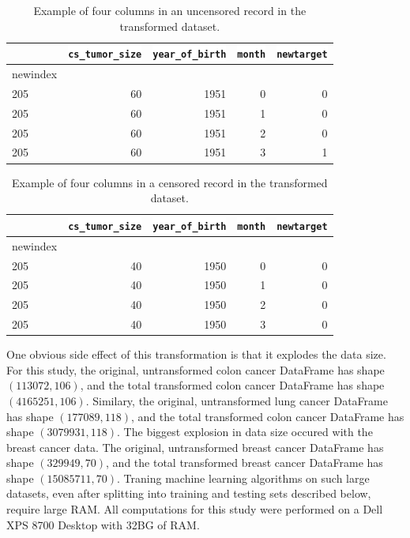 \documentclass[a4paper,11pt]{article}
\newcommand{\codewhite}[1]{\colorbox{white}{\texttt{#1}}}
\begin{document}
\begin{table}[tbp]
\begin{center}
\begin{tabular}{lrrrr}
\toprule
{} &  \codewhite{cs\_tumor\_size} &  \codewhite{year\_of\_birth} &  \codewhite{month} &  \codewhite{newtarget} \\
\midrule
newindex &                &                &        &            \\
205      &             60 &           1951 &      0 &          0 \\
205      &             60 &           1951 &      1 &          0 \\
205      &             60 &           1951 &      2 &          0 \\
205      &             60 &           1951 &      3 &          1 \\
\bottomrule
\end{tabular}
\caption{\label{tab:transformeddead} Example of four columns in an uncensored record in the transformed dataset.}
\end{center}
\end{table}


\begin{table}[tbp]
\begin{center}
\begin{tabular}{lrrrr}
\toprule
{} &  \codewhite{cs\_tumor\_size} &  \codewhite{year\_of\_birth} &  \codewhite{month} &  \codewhite{newtarget} \\
\midrule
newindex &                &                &        &            \\
205      &             40 &           1950 &      0 &          0 \\
205      &             40 &           1950 &      1 &          0 \\
205      &             40 &           1950 &      2 &          0 \\
205      &             40 &           1950 &      3 &          0 \\
\bottomrule
\end{tabular}
\caption{\label{tab:transformedalive} Example of four columns in a censored record in the transformed dataset.}
\end{center}
\end{table}

One obvious side effect of this transformation is that it explodes the data size.
For this study, the original, untransformed colon cancer DataFrame has shape $(113072, 106)$, and the total transformed colon cancer DataFrame has shape $(4165251, 106)$.
Similary, the original, untransformed lung cancer DataFrame has shape $(177089, 118)$, and the total transformed colon cancer DataFrame has shape $(3079931, 118)$.
The biggest explosion in data size occured with the breast cancer data. 
The original, untransformed breast cancer DataFrame has shape $(329949, 70)$, and the total transformed breast cancer DataFrame has shape $(15085711, 70)$.
Traning machine learning algorithms on such large datasets, even after splitting into training and testing sets described below, require large RAM. All computations for this study were performed on a Dell XPS 8700 Desktop with 32BG of RAM.
\end{document}
